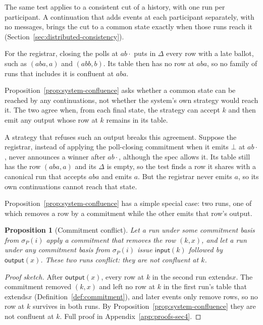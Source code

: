 \documentclass[sigconf]{cidr-2027}
\newtheorem{proposition}{Proposition}
\theoremstyle{remark}
\newcommand{\commitment}{commitment\xspace}
\newcommand{\outrel}{extends\xspace}          %
\begin{document}
The same test applies to a consistent cut of a history, with one run per
participant. A continuation that adds events at each participant separately,
with no messages, brings the cut to a common state exactly when those runs
reach it (Section~\ref{sec:distributed-consistency}).

For the registrar, closing the polls at $ab\cdot$ puts in $\Delta$ every row
with a late ballot, such as $(aba,a)$ and $(abb,b)$. Its table then has no row
at $aba$, so no family of runs that includes it is confluent at $aba$.

Proposition~\ref{prop:system-confluence} asks whether a common state can be
reached by any continuations, not whether the system's own strategy would reach
it. The two agree when, from each final state, the strategy can accept $k$ and
then emit any output whose row at $k$ remains in its table.

A strategy that refuses such an output breaks this agreement. Suppose the
registrar, instead of applying the poll-closing \commitment when it emits
$\bot$ at $ab\cdot$, never announces a winner after $ab\cdot$, although the
spec allows it. Its table still has the row $(aba,a)$ and its $\Delta$ is
empty, so the test finds a row it shares with a canonical run that accepts
$aba$ and emits $a$. But the registrar never emits $a$, so its own
continuations cannot reach that state.

Proposition~\ref{prop:system-confluence} has a simple special case: two runs,
one of which removes a row by a \commitment while the other emits that row's
output.

\begin{proposition}[Commitment conflict]
\label{prop:commitment-conflict}
Let a run under some \commitment basis from $\sigma_P(i)$ apply a \commitment
that removes the row $(k,x)$, and let a run under any \commitment basis from
$\sigma_P(i)$ issue $\mathsf{input}(k)$ followed by $\mathsf{output}(x)$. These two runs
\emph{conflict}: they are not confluent at $k$.
\end{proposition}

\begin{proof}[Proof sketch]
After $\mathsf{output}(x)$, every row at $k$ in the second run \outrel $x$. The \commitment removed $(k,x)$ and left no row at $k$ in the first run's table
that \outrel $x$ (Definition~\ref{def:commitment}), and later events only
remove rows, so no row at $k$ survives in both runs. By
Proposition~\ref{prop:system-confluence} they are not confluent at $k$. Full
proof in Appendix~\ref{app:proofs-sec4}.
\end{proof}
\end{document}
